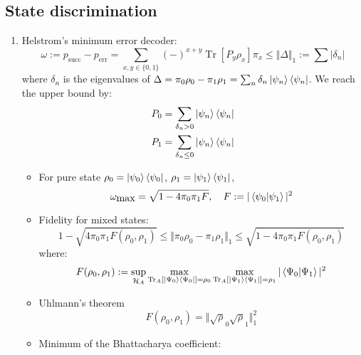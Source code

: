 \documentclass[11pt,a4paper]{article}%
\numberwithin{equation}{section}
\newcommand{\Tr}{\operatorname{Tr}}
\begin{document}
    \subsection{State discrimination} %
    \label{sub:state_discrimination}
    \begin{enumerate}
        \item Helstrom's minimum error decoder:
        \begin{equation}
            \omega := p_{\mbox{succ}} - p_{\mbox{err}} = \sum_{x,y\in\{0,1\}} (-)^{x+y}\Tr [P_y\rho_x]\pi_x \le \Vert \Delta\Vert_1 := \sum|\delta_n|
        \end{equation}
        where $\delta_n$ is the eigenvalues of $\Delta = \pi_0\rho_0 - \pi_1\rho_1 = \sum_n\delta_n\ket{\psi_n}\bra{\psi_n}$. We reach the upper bound by:
        \begin{align*}
            P_0 &= \sum_{\delta_n > 0} \ket{\psi_n}\bra{\psi_n}\\
            P_1 &= \sum_{\delta_n \le 0} \ket{\psi_n}\bra{\psi_n}
        \end{align*}
        \begin{itemize}
            \item For pure state $\rho_0 = \ket{\psi_0}\bra{\psi_0}$, $\rho_1 = \ket{\psi_1}\bra{\psi_1}$, 
            \begin{equation}
                \omega_{\mbox{max}} = \sqrt{1-4\pi_0\pi_1 F},\quad F:= |\braket{\psi_0|\psi_1}|^2
            \end{equation}
            \item Fidelity for mixed states:
            \begin{equation}
                1-\sqrt{4\pi_0\pi_1F(\rho_0,\rho_1)}\le \Vert\pi_0\rho_0 - \pi_1\rho_1\Vert_1\le\sqrt{1-4\pi_0\pi_1F(\rho_0,\rho_1)}
            \end{equation}
            where:
            \begin{equation}
                F(\rho_0,\rho_1) := \sup_{\mathcal H_A} \max_{\Tr_A[\ket{\Psi_0}\bra{\Psi_0}] = \rho_0} \max_{\Tr_A[\ket{\Psi_1}\bra{\Psi_1}] = \rho_1} |\braket{\Psi_0|\Psi_1}|^2
            \end{equation}
            \item Uhlmann's theorem
            \begin{equation}
                F(\rho_0,\rho_1) = \Vert \sqrt\rho_0\sqrt\rho_1\Vert_1^2
            \end{equation}
            \item Minimum of the Bhattacharya coefficient:

\end{itemize}
\end{enumerate}
\end{document}
